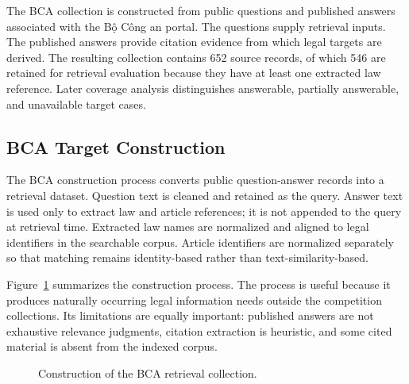 The BCA collection is constructed from public questions and published answers associated with the Bộ Công an portal. The questions supply retrieval inputs. The published answers provide citation evidence from which legal targets are derived. The resulting collection contains 652 source records, of which 546 are retained for retrieval evaluation because they have at least one extracted law reference. Later coverage analysis distinguishes answerable, partially answerable, and unavailable target cases.

\subsection{BCA Target Construction}

The BCA construction process converts public question-answer records into a retrieval dataset. Question text is cleaned and retained as the query. Answer text is used only to extract law and article references; it is not appended to the query at retrieval time. Extracted law names are normalized and aligned to legal identifiers in the searchable corpus. Article identifiers are normalized separately so that matching remains identity-based rather than text-similarity-based.

Figure~\ref{fig:4.2} summarizes the construction process. The process is useful because it produces naturally occurring legal information needs outside the competition collections. Its limitations are equally important: published answers are not exhaustive relevance judgments, citation extraction is heuristic, and some cited material is absent from the indexed corpus.

\begin{figure}[p]
\centering
{}
\caption[Construction of the BCA retrieval collection.]{Construction of the BCA retrieval collection.}
\label{fig:4.2}
\end{figure}

